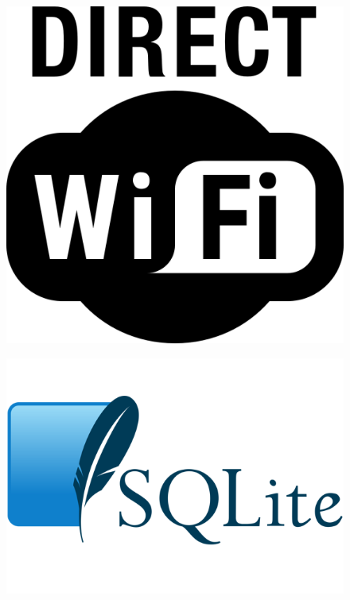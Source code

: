 \documentclass{beamer}
\begin{document}
\begin{frame}
\begin{columns}
\begin{column}{0.5\textwidth}
\begin{figure}
    \end{figure}
     \begin{figure}
       \includegraphics[scale=1.9]{img/wifidirect.png}
     \end{figure}
     \begin{figure}
       \includegraphics[scale=0.14]{img/sqlite.png}
     \end{figure}
    \end{column}
  \end{columns}
\end{frame}
\end{document}
